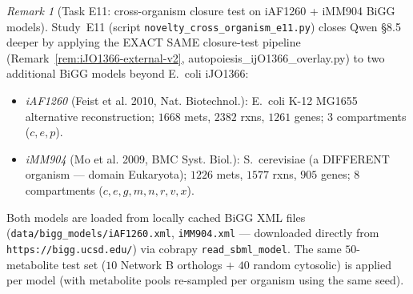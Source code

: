 \documentclass[11pt,a4paper]{article}
\theoremstyle{plain}
\theoremstyle{definition}
\theoremstyle{remark}
\newtheorem{remark}[theorem]{Remark}
\begin{document}
\begin{remark}[Task E11: cross-organism closure test on iAF1260 +
iMM904 BiGG models]
\label{rem:e11-cross-organism}
Study~E11 (script \texttt{novelty\_cross\_organism\_e11.py})
closes Qwen \S 8.5 deeper by applying the EXACT SAME closure-test
pipeline (Remark~\ref{rem:iJO1366-external-v2}, autopoiesis\_ijO1366\_overlay.py)
to two additional BiGG models beyond E.~coli iJO1366:
\begin{itemize}
\item \emph{iAF1260} (Feist et al. 2010, Nat. Biotechnol.): E.~coli
  K-12 MG1655 alternative reconstruction; $1668$ mets, $2382$ rxns,
  $1261$ genes; $3$ compartments ($c, e, p$).
\item \emph{iMM904} (Mo et al. 2009, BMC Syst. Biol.):
  S.~cerevisiae (a DIFFERENT organism --- domain Eukaryota);
  $1226$ mets, $1577$ rxns, $905$ genes; $8$ compartments
  ($c, e, g, m, n, r, v, x$).
\end{itemize}
Both models are loaded from locally cached BiGG XML files
(\texttt{data/bigg\_models/iAF1260.xml}, \texttt{iMM904.xml}
--- downloaded directly from \texttt{https://bigg.ucsd.edu/}) via
cobrapy \texttt{read\_sbml\_model}. The same $50$-metabolite test set
($10$ Network B orthologs $+$ $40$ random cytosolic) is applied
per model (with metabolite pools re-sampled per organism using the
same seed).


\end{remark}
\end{document}
